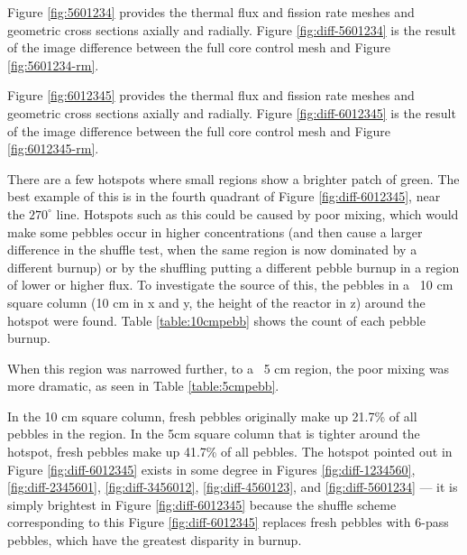 Figure \ref{fig:5601234} provides the thermal flux and fission rate meshes and geometric cross sections axially and radially.  Figure \ref{fig:diff-5601234} is the result of the image difference between the full core control mesh and Figure \ref{fig:5601234-rm}.




Figure \ref{fig:6012345} provides the thermal flux and fission rate meshes and geometric cross sections axially and radially.  Figure \ref{fig:diff-6012345} is the result of the image difference between the full core control mesh and Figure \ref{fig:6012345-rm}.

There are a few hotspots where small regions show a brighter patch of green.  The best example of this is in the fourth quadrant of Figure \ref{fig:diff-6012345}, near the $270^{\circ}$ line.  Hotspots such as this could be caused by poor mixing, which would make some pebbles occur in higher concentrations (and then cause a larger difference in the shuffle test, when the same region is now dominated by a different burnup) or by the shuffling putting a different pebble burnup in a region of lower or higher flux.  To investigate the source of this, the pebbles in a ~10 cm square column (10 cm in x and y, the height of the reactor in z) around the hotspot were found.  Table \ref{table:10cmpebb} shows the count of each pebble burnup.



When this region was narrowed further, to a ~5 cm region, the poor mixing was more dramatic, as seen in Table \ref{table:5cmpebb}.



In the 10 cm square column, fresh pebbles originally make up 21.7\% of all pebbles in the region.  In the 5cm square column that is tighter around the hotspot, fresh pebbles make up 41.7\% of all pebbles.  The hotspot pointed out in Figure \ref{fig:diff-6012345} exists in some degree in Figures \ref{fig:diff-1234560}, \ref{fig:diff-2345601}, \ref{fig:diff-3456012}, \ref{fig:diff-4560123}, and \ref{fig:diff-5601234} --- it is simply brightest in Figure \ref{fig:diff-6012345} because the shuffle scheme corresponding to this Figure \ref{fig:diff-6012345} replaces fresh pebbles with 6-pass pebbles, which have the greatest disparity in burnup.